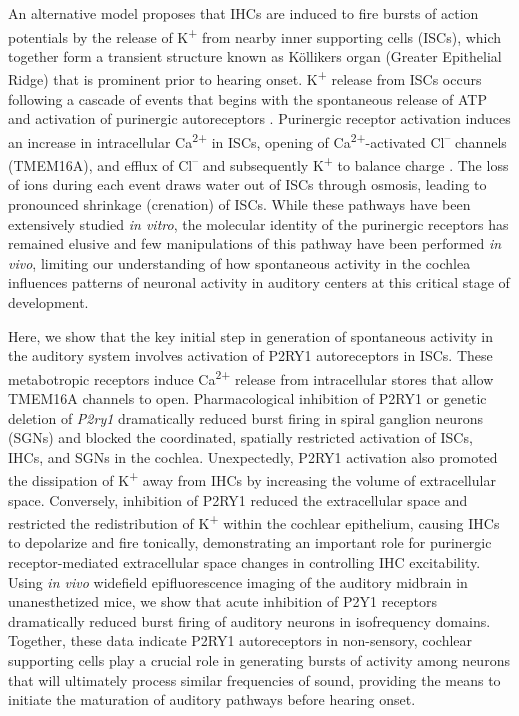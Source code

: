 \documentclass[9pt,lineno]{elife}
\begin{document}
An alternative model proposes that IHCs are induced to fire bursts of action potentials by the release of K\textsuperscript{+} from nearby inner supporting cells (ISCs), which together form a transient structure known as Köllikers organ (Greater Epithelial Ridge) that is prominent prior to hearing onset. K\textsuperscript{+} release from ISCs occurs following a cascade of events that begins with the spontaneous release of ATP and activation of purinergic autoreceptors \citep{Tritsch2010b}. Purinergic receptor activation induces an increase in intracellular Ca\textsuperscript{2+} in ISCs, opening of Ca\textsuperscript{2+}-activated Cl\textsuperscript{--} channels (TMEM16A), and efflux of Cl\textsuperscript{--} and subsequently K\textsuperscript{+} to balance charge \citep{Tritsch2007,Wang2015}. The loss of ions during each event draws water out of ISCs through osmosis, leading to pronounced shrinkage (crenation) of ISCs. While these pathways have been extensively studied \textit{in vitro}, the molecular identity of the purinergic receptors has remained elusive and few manipulations of this pathway have been performed \textit{in vivo}, limiting our understanding of how spontaneous activity in the cochlea influences patterns of neuronal activity in auditory centers at this critical stage of development.

Here, we show that the key initial step in generation of spontaneous activity in the auditory system involves activation of P2RY1 autoreceptors in ISCs. These metabotropic receptors induce Ca\textsuperscript{2+} release from intracellular stores that allow TMEM16A channels to open. Pharmacological inhibition of P2RY1 or genetic deletion of \textit{P2ry1} dramatically reduced burst firing in spiral ganglion neurons (SGNs) and blocked the coordinated, spatially restricted activation of ISCs, IHCs, and SGNs in the cochlea. Unexpectedly, P2RY1 activation also promoted the dissipation of K\textsuperscript{+} away from IHCs by increasing the volume of extracellular space. Conversely, inhibition of P2RY1 reduced the extracellular space and restricted the redistribution of K\textsuperscript{+} within the cochlear epithelium, causing IHCs to depolarize and fire tonically, demonstrating an important role for purinergic receptor-mediated extracellular space changes in controlling IHC excitability. Using \textit{in vivo} widefield epifluorescence imaging of the auditory midbrain in unanesthetized mice, we show that acute inhibition of P2Y1 receptors dramatically reduced burst firing of auditory neurons in isofrequency domains. Together, these data indicate P2RY1 autoreceptors in non-sensory, cochlear supporting cells play a crucial role in generating bursts of activity among neurons that will ultimately process similar frequencies of sound, providing the means to initiate the maturation of auditory pathways before hearing onset.
\end{document}
